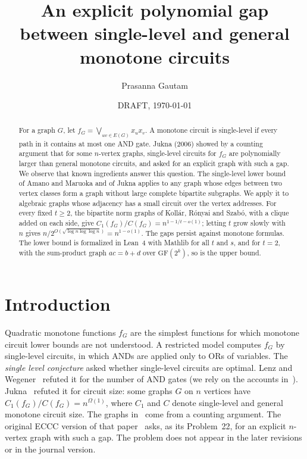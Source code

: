\documentclass[11pt]{article}
\title{An explicit polynomial gap between single-level and general monotone circuits}
\author{Prasanna Gautam}
\date{DRAFT, \today}
\theoremstyle{definition}
\theoremstyle{remark}
\newcommand{\GF}{\mathrm{GF}}
\newcommand{\Cone}{C_1}
\newcommand{\Csize}{C}
\begin{document}
\maketitle

\begin{abstract}
For a graph $G$, let $f_G=\bigvee_{uv\in E(G)}x_ux_v$. A monotone circuit is single-level if every path in it
contains at most one AND gate. Jukna (2006) showed by a counting argument that for some $n$-vertex graphs, single-level
circuits for $f_G$ are polynomially larger than general monotone circuits, and asked for an explicit graph with such a
gap. We observe that known ingredients answer this question. The single-level lower bound of Amano and Maruoka and of
Jukna applies to any graph whose edges between two vertex classes form a graph without large complete bipartite
subgraphs. We apply it to algebraic graphs whose adjacency has a small circuit over the vertex addresses. For every
fixed $t\ge 2$, the bipartite norm graphs of Koll\'ar, R\'onyai and Szab\'o, with a clique added on each side, give
$\Cone(f_G)/\Csize(f_G)=n^{1-1/t-o(1)}$; letting $t$ grow slowly with $n$ gives
$n/2^{O(\sqrt{\log n\log\log n})}=n^{1-o(1)}$. The gaps persist against monotone formulas. The lower bound is formalized in Lean~4 with Mathlib for all $t$ and $s$, and
for $t=2$, with the sum-product graph $ac=b+d$ over $\GF(2^k)$, so is the upper bound.
\end{abstract}

\section{Introduction}

Quadratic monotone functions $f_G$ are the simplest functions for which monotone circuit lower bounds are not
understood. A restricted model computes $f_G$ by single-level circuits, in which ANDs are applied only to ORs of
variables. The \emph{single level conjecture} asked whether single-level circuits are optimal. Lenz and Wegener~\cite{LW91}
refuted it for the number of AND gates (we rely on the accounts in~\cite{AM06,Juk06}). Jukna~\cite{Juk06} refuted it for circuit size: some
graphs $G$ on $n$ vertices have $\Cone(f_G)/\Csize(f_G)=n^{\Omega(1)}$, where $\Cone$ and $\Csize$ denote single-level
and general monotone circuit size. The graphs in~\cite{Juk06} come from a counting argument. The original ECCC version
of that paper~\cite{JukTR} asks, as its Problem~22, for an explicit $n$-vertex graph with such a gap. The problem does
not appear in the later revisions or in the journal version.
\end{document}
